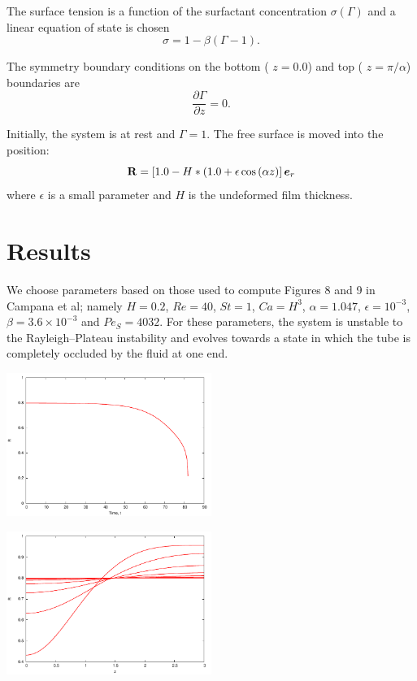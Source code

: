 \begin{center}
\begin{longtabu}
The surface tension is a function of the surfactant concentration $ \sigma(\Gamma)$ and a linear equation of state is chosen \[ \sigma = 1 - \beta (\Gamma - 1). \]

The symmetry boundary conditions on the bottom ( $ z = 0.0 $) and top ( $ z = \pi / \alpha $) boundaries are \[ \frac{\partial \Gamma}{\partial z} = 0. \]

Initially, the system is at rest and $ \Gamma =1 $. The free surface is moved into the position\+: \[ \mathbf{R} = \left[1.0 - H*(1.0 + \epsilon\cos \left(\alpha z\right) \right] \mbox{\boldmath$e$}_{r} \] where $ \epsilon $ is a small parameter and $ H$ is the undeformed film thickness.   \\
\end{longtabu}
\end{center} 



 

\hypertarget{index_results}{}\section{Results}\label{index_results}
We choose parameters based on those used to compute Figures 8 and 9 in Campana et al; namely $ H = 0.2 $, $ Re = 40 $, $ St = 1$, $ Ca = H^{3} $, $ \alpha = 1.047 $, $ \epsilon = 10^{-3}$, $ \beta = 3.6 \times 10^{-3} $ and $Pe_{S} = 4032$. For these parameters, the system is unstable to the Rayleigh--Plateau instability and evolves towards a state in which the tube is completely occluded by the fluid at one end.

 
\begin{DoxyImage}
\includegraphics[width=0.5\textwidth]{trace}
\end{DoxyImage}


 
\begin{DoxyImage}
\includegraphics[width=0.5\textwidth]{evolution}
\end{DoxyImage}


